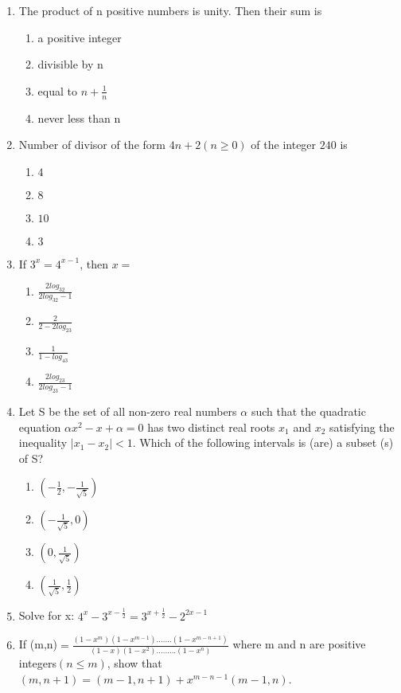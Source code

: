 \begin{enumerate}[label=\arabic*.,ref=\thesubsection.\theenumi]
\item The product of n positive numbers is unity. Then their sum is
\begin{enumerate}
\item a positive integer
\item divisible by n
\item equal to $n+\frac{1}{n}$
\item never less than n
\end{enumerate}

\item Number of divisor of the form $4n+2(n\geq0)$ of the integer $240$ is
\begin{enumerate}
\item $4$
\item $8$ 
\item $10$
\item $3$
\end{enumerate}

\item If $3^{x}=4^{x-1}$, then $x=$
\begin{enumerate}
\item $\frac{2log_32}{2log_32-1}$
\item $\frac{2}{2-2log_23}$
\item $\frac{1}{1-log_43}$
\item $\frac{2log_23}{2log_23-1}$
\end{enumerate}

\item Let S be the set of all non-zero real numbers $\alpha$ such that the quadratic equation $\alpha{x}^{2}-x+\alpha=0$ has two distinct real roots $x_1$ and $x_2$ satisfying the inequality $|x_1-x_2|<1$. Which of the following intervals is (are) a subset (s) of S?
\begin{enumerate}
\item $(-\frac{1}{2},-\frac{1}{\sqrt5})$
\item $(-\frac{1}{\sqrt5},0)$
\item $(0,\frac{1}{\sqrt5})$
\item $(\frac{1}{\sqrt5},\frac{1}{2})$
\end{enumerate}

\item Solve for x: $4^x-3^{x-\frac{1}{2}}=3^{x+\frac{1}{2}}-2^{2x-1}$

\item If (m,n)$=\frac{(1-x^m)(1-x^{m-1}).......(1-x^{m-n+1})}{(1-x)(1-x^2).........(1-x^n)}$ where m and n are positive integers$(n\leq{m})$, show that $(m,n+1)=(m-1,n+1)+x^{m-n-1}(m-1,n)$.


\end{enumerate}
